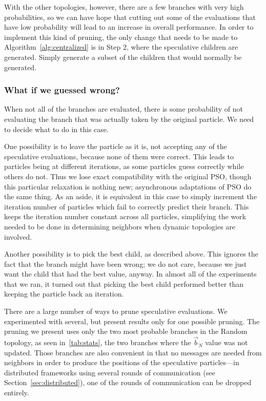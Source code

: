 \documentclass[journal,letterpaper]{IEEEtran}
\renewcommand{\sec}[1]{Section~\ref{sec:#1}}
\newcommand{\alg}[1]{Algorithm~\ref{alg:#1}}
\providecommand{\nbest}{\ensuremath{\Vec{b}_N}}
\begin{document}
With the other topologies, however, there are a few branches with very high
probabilities, so we can have hope that cutting out some of the evaluations
that have low probability will lead to an increase in overall performance.  In
order to implement this kind of pruning, the only change that needs to be made
to \alg{centralized} is in Step 2, where the speculative children are
generated.  Simply generate a subset of the children that would normally be
generated.

\subsubsection{What if we guessed wrong?}

When not all of the branches are evaluated, there is some probability of not
evaluating the branch that was actually taken by the original particle.  We 
need to decide what to do in this case.  

One possibility is to leave the particle as it is, not accepting any of the
speculative evaluations, because none of them were correct.  This leads to
particles being at different iterations, as some particles guess correctly
while others do not.  Thus we lose exact compatibility with the original PSO,
though this particular relaxation is nothing new; asynchronous adaptations of
PSO do the same thing.  As an aside, it is equivalent in this case to simply
increment the iteration number of particles which fail to correctly predict
their branch.  This keeps the iteration number constant across all particles,
simplifying the work needed to be done in determining neighbors when dynamic
topologies are involved.

Another possibility is to pick the best child, as described above.  This
ignores the fact that the branch might have been wrong; we do not care, because
we just want the child that had the best value, anyway.  In almost all of the
experiments that we ran, it turned out that picking the best child performed
better than keeping the particle back an iteration.

There are a large number of ways to prune speculative evaluations.  We
experimented with several, but present results only for one possible pruning.
The pruning we present uses only the two most probable branches in the Random
topology, as seen in~\ref{tab:stats}, the two branches where the $\nbest$ value
was not updated.  Those branches are also convenient in that no messages are
needed from neighbors in order to produce the positions of the speculative
particles---in distributed frameworks using several rounds of communication
(see \sec{distributed}), one of the rounds of communication can be dropped
entirely.
\end{document}
